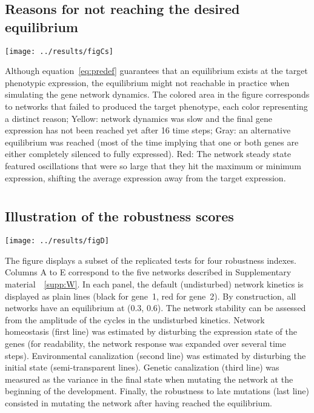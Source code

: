 \documentclass[10pt,a4paper]{article}
\newcommand{\SupMat}{Supplementary material~}
\begin{document}
\begin{appendices}
    \subsection*{Reasons for not reaching the desired equilibrium}
	\begin{center}
	\texttt{[image: ../results/figCs]}
	\end{center}
	
	{\color{Gray} Although equation~\ref{eq:predef} guarantees that an equilibrium exists at the target phenotypic expression, the equilibrium might not reachable in practice when simulating the gene network dynamics. The colored area in the figure corresponds to networks that failed to produced the target phenotype, each color representing a distinct reason; Yellow: network dynamics was slow and the final gene expression has not been reached yet after 16 time steps; Gray: an alternative equilibrium was reached (most of the time implying that one or both genes are either completely silenced to fully expressed). Red: The network steady state featured oscillations that were so large that they hit the maximum or minimum expression, shifting the average expression away from the target expression. }

  \clearpage


  \clearpage
  \section{}
    \label{supp:simpanels}
    \subsection*{Illustration of the robustness scores}

	\begin{adjustwidth}{-1in}{0in}
	\begin{flushright}
	\texttt{[image: ../results/figD]}
	\end{flushright}
	\color{Gray} The figure displays a subset of the replicated tests for four robustness indexes. Columns A to E correspond to the five networks described in \SupMat~\ref{supp:W}. In each panel, the default (undisturbed) network kinetics is displayed as plain lines (black for gene~1, red for gene~2). By construction, all networks have an equilibrium at (0.3, 0.6). The network stability can be assessed from the amplitude of the cycles in the undisturbed kinetics. Network homeostasis (first line) was estimated by disturbing the expression state of the genes (for readability, the network response was expanded over several time steps). Environmental canalization (second line) was estimated by disturbing the initial state (semi-transparent lines). Genetic canalization (third line) was measured as the variance in the final state when mutating the network at the beginning of the development. Finally, the robustness to late mutations (last line) consisted in mutating the network after having reached the equilibrium.
	\end{adjustwidth}



\end{appendices}
\end{document}
